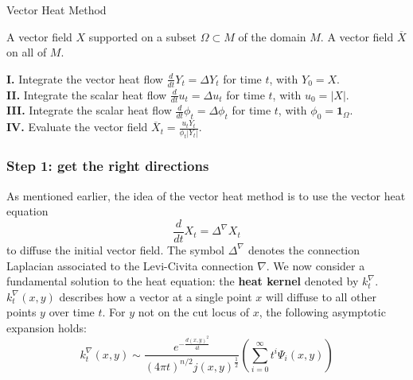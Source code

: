 \documentclass[sigconf]{acmart}
\begin{document}
\begin{algorithm}
\caption{Vector Heat Method} \label{algo1}
\begin{algorithmic}
\Require A vector field $X$ supported on a subset $\Omega \subset M$ of the domain $M$.
\Ensure A vector field $\overline{X}$ on all of $M$.

\noindent \textbf{I.} Integrate the vector heat flow $\frac{d}{dt} Y_t = \Delta Y_t$ for time $t$, with $Y_0 = X$. \\

\textbf{II.} Integrate the scalar heat flow $\frac{d}{dt} u_t = \Delta u_t$ for time $t$, with $u_0 = |X|$. \\

\textbf{III.} Integrate the scalar heat flow $\frac{d}{dt} \phi_t = \Delta \phi_t$ for time $t$, with $\phi_0 = \mathbf{1}_{\Omega}$. \\

\textbf{IV.} Evaluate the vector field $\overline{X}_t = \frac{u_t Y_t}{\phi_t |Y_t|}$.
\end{algorithmic}
\end{algorithm}

\subsubsection{Step 1: get the right directions}
As mentioned earlier, the idea of the vector heat method is to use the vector heat equation 
\begin{equation} \label{eq:vector-heat}
  \frac{d}{dt} X_t = \Delta^\nabla X_t
  \end{equation}
to diffuse the initial vector field. The symbol $\Delta^\nabla$ denotes the connection Laplacian associated to the Levi-Civita connection $\nabla$. 
We now consider a fundamental solution to the heat equation: the \textbf{heat kernel} denoted by $k_t^\nabla$. $k_t^\nabla(x,y)$ describes how 
a vector at a single point $x$ will diffuse to all other points $y$ over time $t$. For $y$ not on the cut locus of $x$, the following asymptotic
expansion holds:
\begin{equation} \label{eq:asymptotic_expansion}
  k_t^\nabla(x, y) \sim \frac{e^{-\frac{d(x, y)^2}{4t}}}{(4 \pi t)^{n/2} j(x, y)^\frac{1}{2}} 
\left( \sum_{i=0}^{\infty} t^i \Psi_i(x, y) \right)
  \end{equation}
\end{document}
